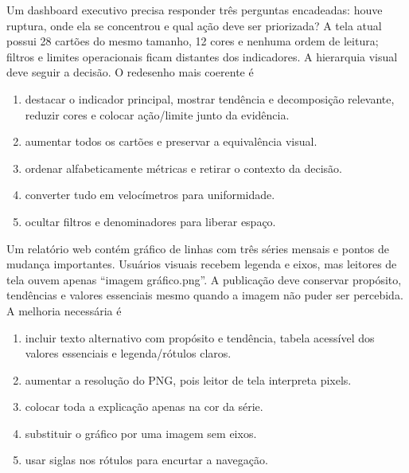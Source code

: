 \TextoBase Um dashboard executivo precisa responder três perguntas encadeadas: houve ruptura, onde ela se concentrou e qual ação deve ser priorizada? A tela atual possui 28 cartões do mesmo tamanho, 12 cores e nenhuma ordem de leitura; filtros e limites operacionais ficam distantes dos indicadores. A hierarquia visual deve seguir a decisão.
\FonteDidatica
\Comando O redesenho mais coerente é
\begin{enumerate}[label=\Alph*)]\item destacar o indicador principal, mostrar tendência e decomposição relevante, reduzir cores e colocar ação/limite junto da evidência.\item aumentar todos os cartões e preservar a equivalência visual.\item ordenar alfabeticamente métricas e retirar o contexto da decisão.\item converter tudo em velocímetros para uniformidade.\item ocultar filtros e denominadores para liberar espaço.\end{enumerate}

\TextoBase Um relatório web contém gráfico de linhas com três séries mensais e pontos de mudança importantes. Usuários visuais recebem legenda e eixos, mas leitores de tela ouvem apenas ``imagem gráfico.png''. A publicação deve conservar propósito, tendências e valores essenciais mesmo quando a imagem não puder ser percebida.
\FonteDidatica
\Comando A melhoria necessária é
\begin{enumerate}[label=\Alph*)]\item incluir texto alternativo com propósito e tendência, tabela acessível dos valores essenciais e legenda/rótulos claros.\item aumentar a resolução do PNG, pois leitor de tela interpreta pixels.\item colocar toda a explicação apenas na cor da série.\item substituir o gráfico por uma imagem sem eixos.\item usar siglas nos rótulos para encurtar a navegação.\end{enumerate}

